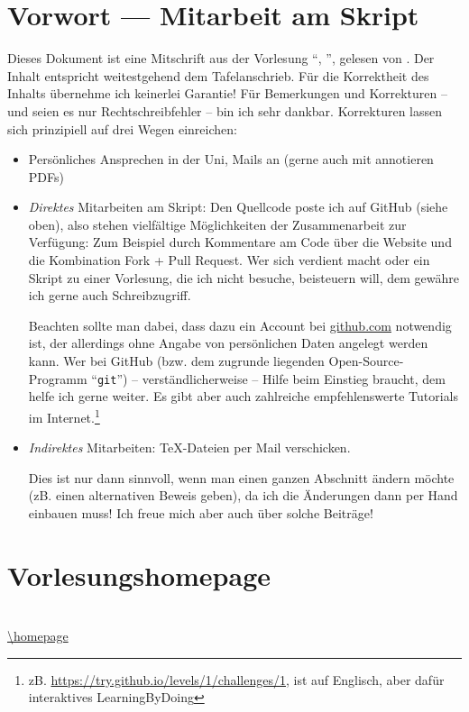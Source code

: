 \section*{Vorwort --- Mitarbeit am Skript}
Dieses Dokument ist eine Mitschrift aus der Vorlesung \enquote{\fach, \semester}, gelesen von \prof. Der Inhalt entspricht weitestgehend dem Tafelanschrieb. Für die
Korrektheit des Inhalts übernehme ich keinerlei Garantie! Für Bemerkungen und Korrekturen -- und seien es nur Rechtschreibfehler -- bin ich sehr dankbar. 
Korrekturen lassen sich prinzipiell auf drei Wegen einreichen: 
\begin{itemize}
	\item Persönliches Ansprechen in der Uni, Mails an  (gerne auch mit annotieren PDFs) 
	\item \emph{Direktes} Mitarbeiten am Skript: Den Quellcode poste ich auf GitHub (siehe oben), also stehen vielfältige Möglichkeiten der Zusammenarbeit zur Verfügung:
	Zum Beispiel durch Kommentare am Code über die Website und die Kombination Fork + Pull Request. Wer sich verdient macht oder ein Skript zu einer Vorlesung, die 
	ich nicht besuche, beisteuern will, dem gewähre ich gerne auch Schreibzugriff.
	
	Beachten sollte man dabei, dass dazu ein Account bei \url{github.com} notwendig ist, der allerdings ohne Angabe von persönlichen Daten angelegt werden kann. 
	Wer bei GitHub (bzw. dem zugrunde liegenden Open-Source-Programm \enquote{\texttt{git}}) -- verständlicherweise -- Hilfe beim Einstieg braucht, dem helfe ich gerne 
	weiter. Es gibt aber auch zahlreiche empfehlenswerte Tutorials im Internet.\footnote{zB. \url{https://try.github.io/levels/1/challenges/1}, ist auf Englisch, aber dafür 
	interaktives LearningByDoing}
	\item \emph{Indirektes} Mitarbeiten: \TeX-Dateien per Mail verschicken. 
	
	Dies ist nur dann sinnvoll, wenn man einen ganzen Abschnitt ändern möchte (zB. einen alternativen Beweis geben), da ich die Änderungen dann per Hand einbauen muss! Ich freue mich aber auch über solche Beiträge!
\end{itemize}
\section*{Vorlesungshomepage}
{\centering 
\begin{minipage}[c][][c]{\textwidth}
	\centering \qrcode[height=3cm]{\homepage} \medskip\\
	\footnotesize \url{\homepage}
\end{minipage}
\par}
